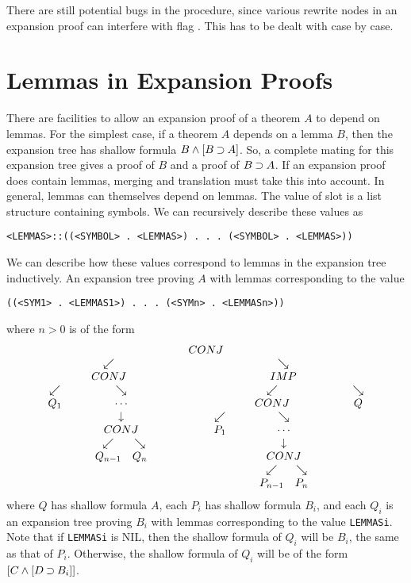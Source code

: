 There are still potential bugs in the procedure, since
various rewrite nodes in an expansion proof can interfere with
flag . This has to be dealt with case by case.

\section{Lemmas in Expansion Proofs}\label{exp-pf-lemmas}

There are facilities to allow an expansion proof of a theorem $A$
to depend on lemmas.  For the simplest case, if a theorem $A$ depends
on a lemma $B$, then the expansion tree has shallow formula
$B\land [B\mathbin{\supset} A]$.  So, a complete mating for this expansion
tree gives a proof of $B$ and a proof of $B\mathbin{\supset} A$.
If an expansion proof does contain lemmas, merging and translation
must take this into account.  In general, lemmas can themselves
depend on lemmas.  The value of  slot is
a list structure containing symbols.  We can recursively
describe these values as
\begin{verbatim}
<LEMMAS>::((<SYMBOL> . <LEMMAS>) . . . (<SYMBOL> . <LEMMAS>))
\end{verbatim}
We can describe how these values correspond to lemmas
in the expansion tree inductively.  An expansion tree
proving $A$ with lemmas corresponding to the value
\begin{verbatim}
((<SYM1> . <LEMMAS1>) . . . (<SYMn> . <LEMMASn>))
\end{verbatim}
where $n>0$ is of the form
$$
{{\begin{array}[t]{c}CONJ \\ \begin{array}[t]{cc} \swarrow & \searrow \\ {{\begin{array}[t]{c}CONJ \\ \begin{array}[t]{cc} \swarrow & \searrow \\ Q_1 & {\begin{array}[t]{c}\cdots \\ \begin{array}[t]{c} \downarrow \\ {{\begin{array}[t]{c}CONJ \\ \begin{array}[t]{cc} \swarrow & \searrow \\ Q_{n-1} & Q_n \end{array}\end{array}}}\end{array}\end{array}} \end{array}\end{array}}} & {{\begin{array}[t]{c}IMP \\ \begin{array}[t]{cc} \swarrow & \searrow \\ {{\begin{array}[t]{c}CONJ \\ \begin{array}[t]{cc} \swarrow & \searrow \\ P_1 & {\begin{array}[t]{c}\cdots \\ \begin{array}[t]{c} \downarrow \\ {{\begin{array}[t]{c}CONJ \\ \begin{array}[t]{cc} \swarrow & \searrow \\ P_{n-1} & P_n \end{array}\end{array}}}\end{array}\end{array}} \end{array}\end{array}}} & Q \end{array}\end{array}}} \end{array}\end{array}}}
$$
where $Q$ has shallow formula $A$,
each $P_i$ has shallow formula $B_i$,
and each $Q_i$ is an expansion tree proving $B_i$
with lemmas corresponding to the value \verb+LEMMASi+.
Note that if \verb+LEMMASi+ is NIL, then the shallow
formula of $Q_i$ will be $B_i$, the same as that of $P_i$.
Otherwise, the shallow formula of $Q_i$ will be
of the form $[C \land [D \mathbin{\supset} B_i]]$.


